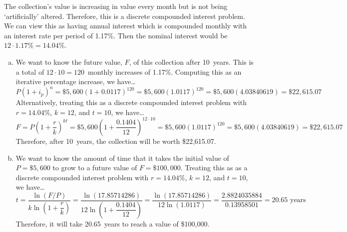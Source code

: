 \documentclass[11pt,letterpaper]{article}
\begin{document}
\sol The collection's value is increasing in value every month but is not being `artificially' altered. Therefore, this is a discrete compounded interest problem. We can view this as having annual interest which is compounded monthly with an interest rate per period of 1.17\%. Then the nominal interest would be $12 \cdot 1.17\%= 14.04\%$. \pspace

\sol 
\begin{enumerate}[(a)]
\item We want to know the future value, $F$, of this collection after 10~years. This is a total of $12 \cdot 10= 120$~monthly increases of 1.17\%. Computing this as an iterative percentage increase, we have\dots
	\[
	P(1 + i_p)^n= \$5,\!600 (1 + 0.0117)^{120}= \$5,\!600 (1.0117)^{120}= \$5,\!600 (4.03840619)= \$22,\!615.07
	\]
Alternatively, treating this as a discrete compounded interest problem with $r= 14.04\%$, $k= 12$, and $t= 10$, we have\dots
	\[
	F= P \left(1 + \dfrac{r}{k} \right)^{kt}= \$5,\!600 \left(1 + \dfrac{0.1404}{12} \right)^{12 \cdot 10}= \$5,600 (1.0117)^{120}= \$5,\!600 (4.03840619)= \$22,\!615.07
	\] 
Therefore, after 10~years, the collection will be worth \$22,615.07. \pspace

\item We want to know the amount of time that it takes the initial value of $P= \$5,\!600$ to grow to a future value of $F= \$100,\!000$. Treating this as as a discrete compounded interest problem with $r= 14.04\%$, $k= 12$, and $t= 10$, we have\dots
	\[
	t= \dfrac{\ln(F/P)}{k \ln \left(1 + \dfrac{r}{k} \right)}= \dfrac{\ln(17.85714286)}{12 \ln \left(1 + \dfrac{0.1404}{12} \right)}= \dfrac{\ln(17.85714286)}{12 \ln(1.0117)}= \dfrac{2.8824035884}{0.13958501}= 20.65 \text{ years}
	\]
Therefore, it will take 20.65~years to reach a value of \$100,000. 
\end{enumerate}
\end{document}
